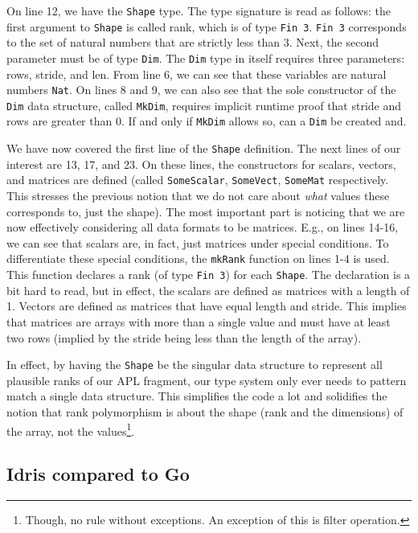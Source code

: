 \documentclass{report}
\begin{document}
On line 12, we have the \verb|Shape| type. The type signature is read as follows: the first argument to \verb|Shape| is called rank, which is of type \verb|Fin 3|. \verb|Fin 3| corresponds to the set of natural numbers that are strictly less than 3. Next, the second parameter must be of type \verb|Dim|. The \verb|Dim| type in itself requires three parameters: rows, stride, and len. From line 6, we can see that these variables are natural numbers \verb|Nat|. On lines 8 and 9, we can also see that the sole constructor of the \verb|Dim| data structure, called \verb|MkDim|, requires implicit runtime proof that stride and rows are greater than 0. If and only if \verb|MkDim| allows so, can a \verb|Dim| be created and.

We have now covered the first line of the \verb|Shape| definition. The next lines of our interest are 13, 17, and 23. On these lines, the constructors for scalars, vectors, and matrices are defined (called \verb|SomeScalar|, \verb|SomeVect|, \verb|SomeMat| respectively. This stresses the previous notion that we do not care about \emph{what} values these corresponds to, just the shape). The most important part is noticing that we are now effectively considering all data formats to be matrices. E.g., on lines 14-16, we can see that scalars are, in fact, just matrices under special conditions. To differentiate these special conditions, the \verb|mkRank| function on lines 1-4 is used. This function declares a rank (of type \verb|Fin 3|) for each \verb|Shape|. The declaration is a bit hard to read, but in effect, the scalars are defined as matrices with a length of 1. Vectors are defined as matrices that have equal length and stride. This implies that matrices are arrays with more than a single value and must have at least two rows (implied by the stride being less than the length of the array).

In effect, by having the \verb|Shape| be the singular data structure to represent all plausible ranks of our APL fragment, our type system only ever needs to pattern match a single data structure. This simplifies the code a lot and solidifies the notion that rank polymorphism is about the shape (rank and the dimensions) of the array, not the values\footnote{Though, no rule without exceptions. An exception of this is filter operation.}.

\subsection{Idris compared to Go}
\end{document}
